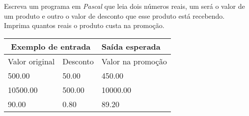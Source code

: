 \item Escreva um programa em \emph{Pascal} que leia dois números reais, um 
será o valor de um produto e outro o valor de desconto que esse produto está 
recebendo. Imprima quantos reais o produto custa na promoção.

\begin{center}
\begin{tabular}{|l|l|l|} \hline
\multicolumn{2}{|c|}{Exemplo de entrada} & Saída esperada \\ \hline
Valor original & Desconto & Valor na promoção \\ \hline
500.00         & 50.00  & 450.00 \\ \hline
10500.00       & 500.00 & 10000.00\\ \hline
90.00          & 0.80   & 89.20 \\ \hline
\end{tabular}
\end{center}